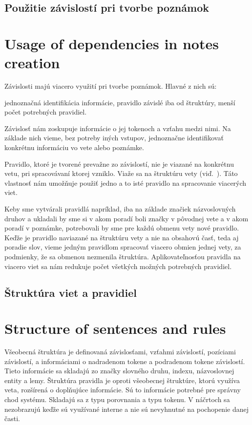 %
%
{
	\subsection{Použitie závislostí pri tvorbe poznámok}
}
{
	\section{Usage of dependencies in notes creation}
}
\label{subsection:use_of_dependencies_in_notes_creation}
Závislosti majú viacero využití pri tvorbe poznámok. Hlavné z nich sú:

\begin{my_itemize}
	\myitem jednoznačná identifikácia informácie,
	\myitem pravidlo závislé iba od štruktúry,
	\myitem menší počet potrebných pravidiel.
\end{my_itemize}

Závislosť nám zoskupuje informácie o jej tokenoch a vzťahu medzi nimi. Na základe nich vieme, bez potreby iných vstupov, jednoznačne identifikovať konkrétnu informáciu vo vete alebo poznámke.

Pravidlo, ktoré je tvorené prevažne zo závislostí, nie je viazané na konkrétnu vetu, pri spracovávaní ktorej vzniklo. Viaže sa na štruktúru vety (viď.~). Táto vlastnosť nám umožňuje použiť jedno a to isté pravidlo na spracovanie viacerých viet.

Keby sme vytvárali pravidlá napríklad, iba na základe značiek názvoslovných druhov a ukladali by sme si v akom poradí boli značky v pôvodnej vete a v akom poradí v poznámke, potrebovali by sme pre každú obmenu vety nové pravidlo. Keďže je pravidlo naviazané na štruktúru vety a nie na obsahovú časť, teda aj poradie slov, vieme jedným pravidlom spracovať viacero obmien jednej vety, za podmienky, že sa obmenou nezmenila štruktúra. Aplikovateľnosťou pravidla na viacero viet sa nám redukuje počet všetkých možných potrebných pravidiel.

%
%
{
	\subsection{Štruktúra viet a pravidiel}
}
{
	\section{Structure of sentences and rules}
}
\label{subsection:structure_of_sentences_and_rules}
Všeobecná štruktúra je definovaná závislosťami, vzťahmi závislostí, pozíciami závislostí, a informáciami o nadradenom tokene a podradenom tokene závislostí. Tieto informácie sa skladajú zo značky slovného druhu, indexu, názvoslovnej entity a lemy. Štruktúra pravidla je oproti všeobecnej štruktúre, ktorú využíva veta, rozšírená o doplňujúce informácie. Sú to informácie potrebné pre správny chod systému. Skladajú sa z typu porovnania a typu tokenu. V náčrtoch sa nezobrazujú keďže sú využívané interne a nie sú nevyhnutné na pochopenie danej časti.

